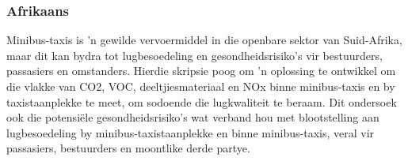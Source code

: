 \subsubsection*{Afrikaans}
Minibus-taxis is 'n gewilde vervoermiddel in die openbare sektor van Suid-Afrika, maar dit kan bydra tot lugbesoedeling en gesondheidsrisiko's vir bestuurders, passasiers en omstanders. Hierdie skripsie poog om 'n oplossing te ontwikkel om die vlakke van CO2, VOC, deeltjiesmateriaal en NOx binne minibus-taxis en by taxistaanplekke te meet, om sodoende die lugkwaliteit te beraam.
Dit ondersoek ook die potensiële gesondheidsrisiko's wat verband hou met blootstelling aan lugbesoedeling by minibus-taxistaanplekke en binne minibus-taxis, veral vir passasiers, bestuurders en moontlike derde partye.

